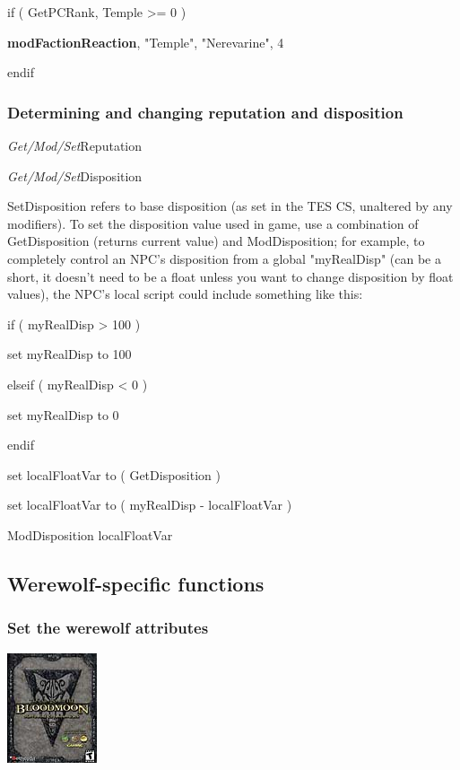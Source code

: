 if ( GetPCRank, Temple \textgreater= 0 )

\textbf{modFactionReaction}, "Temple", "Nerevarine", 4

endif

\hypertarget{determining-and-changing-reputation-and-disposition}{%
\subsubsection{Determining and changing reputation and
disposition}\label{determining-and-changing-reputation-and-disposition}}

\emph{Get/Mod/Set}Reputation

\emph{Get/Mod/Set}Disposition

SetDisposition refers to base disposition (as set in the TES CS,
unaltered by any modifiers). To set the disposition value used in game,
use a combination of GetDisposition (returns current value) and
ModDisposition; for example, to completely control an NPC's disposition
from a global "myRealDisp" (can be a short, it doesn't need to be a
float unless you want to change disposition by float values), the NPC's
local script could include something like this:

if ( myRealDisp \textgreater{} 100 )

set myRealDisp to 100

elseif ( myRealDisp \textless{} 0 )

set myRealDisp to 0

endif

set localFloatVar to ( GetDisposition )

set localFloatVar to ( myRealDisp - localFloatVar )

ModDisposition localFloatVar

\emph{\hfill\break
}

\hypertarget{werewolf-specific-functions}{%
\subsection{Werewolf-specific
functions}\label{werewolf-specific-functions}}

\hypertarget{set-the-werewolf-attributes}{%
\subsubsection{Set the werewolf
attributes}\label{set-the-werewolf-attributes}}

\includegraphics{media/image7.png}


